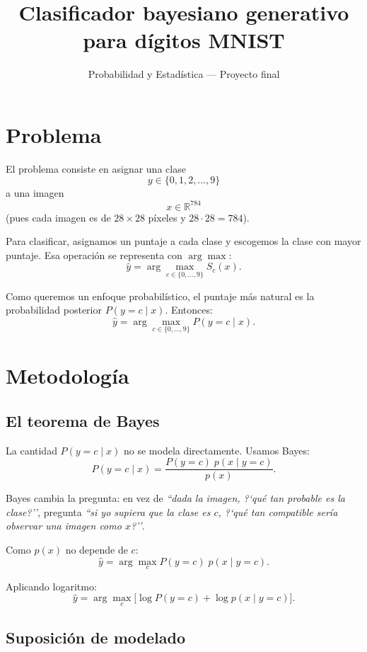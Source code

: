 \documentclass[11pt,a4paper]{article}
\title{\textbf{Clasificador bayesiano generativo\\para d\'igitos MNIST}}
\author{Probabilidad y Estad\'istica --- Proyecto final}
\date{}
\begin{document}
\maketitle

\section{Problema}

El problema consiste en asignar una clase
\[
  y \in \{0,1,2,\dots,9\}
\]
a una imagen
\[
  x \in \mathbb{R}^{784}
\]
(pues cada imagen es de $28\times 28$ p\'ixeles y $28\cdot 28 = 784$).

Para clasificar, asignamos un puntaje a cada clase y escogemos la clase con
mayor puntaje. Esa operaci\'on se representa con $\arg\max$:
\[
  \hat{y} = \arg\max_{c\in\{0,\dots,9\}} S_c(x).
\]

Como queremos un enfoque probabil\'istico, el puntaje m\'as natural es la
probabilidad posterior $P(y=c\mid x)$. Entonces:
\[
  \hat{y} = \arg\max_{c\in\{0,\dots,9\}} P(y=c\mid x).
\]

\section{Metodolog\'ia}

\subsection{El teorema de Bayes}

La cantidad $P(y=c\mid x)$ no se modela directamente. Usamos Bayes:
\[
  P(y=c\mid x) = \frac{P(y=c)\;p(x\mid y=c)}{p(x)}.
\]

Bayes cambia la pregunta: en vez de \emph{``dada la imagen, ?`qu\'e tan
probable es la clase?''}, pregunta \emph{``si yo supiera que la clase es $c$,
?`qu\'e tan compatible ser\'ia observar una imagen como $x$?''}.

Como $p(x)$ no depende de $c$:
\[
  \hat{y} = \arg\max_c P(y=c)\;p(x\mid y=c).
\]

Aplicando logaritmo:
\[
  \hat{y} = \arg\max_c \bigl[\log P(y=c) + \log p(x\mid y=c)\bigr].
\]

\subsection{Suposici\'on de modelado}
\end{document}
